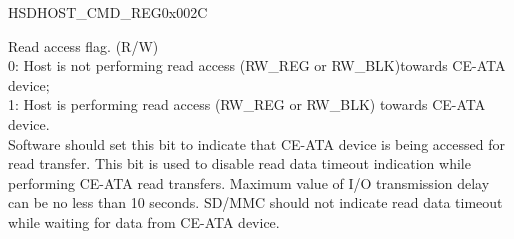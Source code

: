 \begin{register}{H}{SDHOST\_CMD\_REG}{0x{}002C}
\begin{regdesc}
\begin{reglist}
\item [SDHOST\_READ\_CEATA\_DEVICE] Read access flag. (R/W)\\
0: Host is not performing read access (RW\_REG or RW\_BLK)towards CE-ATA device;\\
1: Host is performing read access (RW\_REG or RW\_BLK) towards CE-ATA device.\\
Software should set this bit to indicate that CE-ATA device is being accessed for read transfer. This bit is used to disable read data timeout indication while performing CE-ATA read transfers. Maximum value of I/O transmission delay can be no less than 10 seconds. SD/MMC should not indicate read data timeout while waiting for data from CE-ATA device.
\item [Continued on the next page...]
\end{reglist}\end{regdesc}
\end{register}
\addtocounter{Regfloat}{-1}
